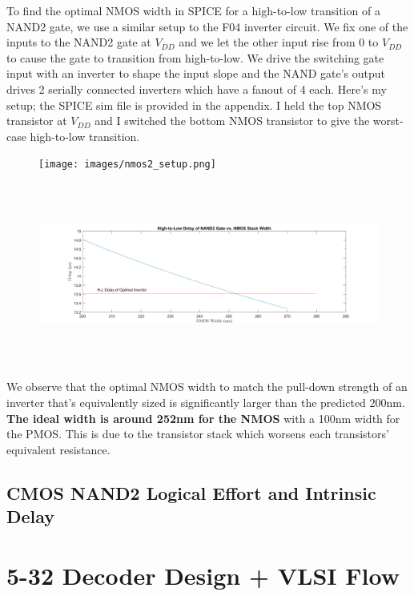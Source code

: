 \documentclass[11pt]{article}
\begin{document}
To find the optimal NMOS width in SPICE for a high-to-low transition of a NAND2 gate, we use a similar setup to the F04 inverter circuit. We fix one of the inputs to the NAND2 gate at $V_{DD}$ and we let the other input rise from 0 to $V_{DD}$ to cause the gate to transition from high-to-low. We drive the switching gate input with an inverter to shape the input slope and the NAND gate's output drives 2 serially connected inverters which have a fanout of 4 each. Here's my setup; the SPICE sim file is provided in the appendix. I held the top NMOS transistor at $V_{DD}$ and I switched the bottom NMOS transistor to give the worst-case high-to-low transition.

\begin{figure}[H]
	\centerline{\texttt{[image: images/nmos2\_setup.png]}}
\end{figure}

\begin{figure}[H]
	\centerline{\includegraphics[height=6cm]{images/nand2_delay_vs_width.png}}
\end{figure}

We observe that the optimal NMOS width to match the pull-down strength of an inverter that's equivalently sized is significantly larger than the predicted 200nm. \textbf{The ideal width is around 252nm for the NMOS} with a 100nm width for the PMOS. This is due to the transistor stack which worsens each transistors' equivalent resistance.
 
\subsection{CMOS NAND2 Logical Effort and Intrinsic Delay}


\section{5-32 Decoder Design + VLSI Flow}
\end{document}
